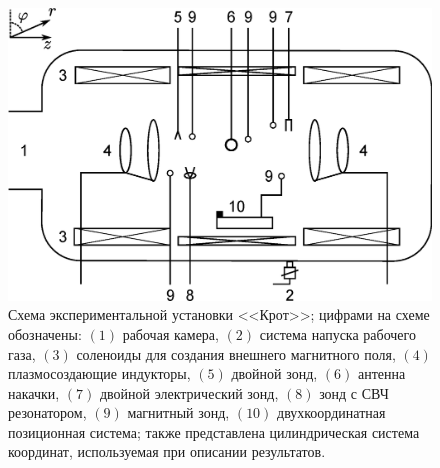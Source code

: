 \documentclass[10pt]{disser}
\begin{document}
\begin{figure}[H]
  \centering
  \includegraphics*[width=0.9\columnwidth]{pics/KROT.eps}
  \caption{Схема экспериментальной установки <<Крот>>; цифрами на схеме обозначены:  $(1)$ рабочая камера,  $(2)$ система напуска рабочего газа, $(3)$  соленоиды для создания внешнего магнитного поля, $(4)$ плазмосоздающие индукторы, $(5)$ двойной зонд, $(6)$ антенна накачки, $(7)$ двойной электрический зонд, $(8)$ зонд с СВЧ резонатором, $(9)$ магнитный зонд, $(10)$ двухкоординатная позиционная система; также представлена цилиндрическая система  координат, используемая при описании результатов.}
  \label{fig:KROT}
\end{figure}
\end{document}
